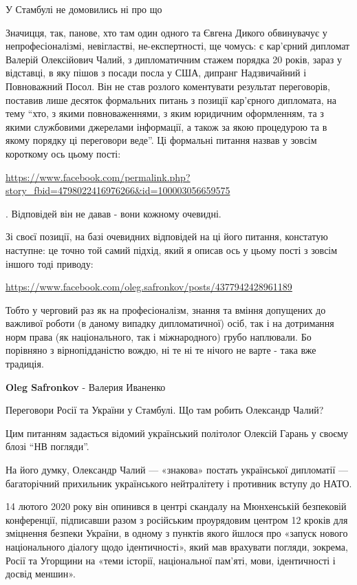 \begin{itemize}
У Стамбулі не домовились ні про що


Значицця, так, панове, хто там один одного та Євгена Дикого обвинувачує у
непрофесіоналізмі, невігластві, не-експертності, ще чомусь: є кар'єрний
дипломат Валерій Олексійович Чалий, з дипломатичним стажем порядка 20 років,
зараз у відставці, в яку пішов з посади посла у США, дипранг Надзвичайний і
Повноважний Посол. Він не став розлого коментувати результат переговорів,
поставив лише десяток формальних питань з позиції кар'єрного дипломата, на тему
\enquote{хто, з якими повноваженнями, з яким юридичним оформленням, та з якими
службовими джерелами інформації, а також за якою процедурою та в якому порядку
ці переговори веде}. Ці формальні питання назвав у зовсім короткому ось цьому
пості:

\url{https://www.facebook.com/permalink.php?story_fbid=4798022416976266&id=100003056659575}

. Відповідей він не давав - вони кожному очевидні.

Зі своєї позиції, на базі очевидних відповідей на ці його питання, констатую
наступне: це точно той самий підхід, який я описав ось у цьому пості з зовсім
іншого тоді приводу:

\url{https://www.facebook.com/oleg.safronkov/posts/4377942428961189}

Тобто у черговий раз як на професіоналізм, знання та вміння допущених до
важливої роботи (в даному випадку дипломатичної) осіб, так і на дотримання норм
права (як національного, так і міжнародного) грубо наплювали. Бо порівняно з
вірнопідданістю вождю, ні те ні те нічого не варте - така вже традиція.

\begin{itemize} %
\textbf{Oleg Safronkov} - Валерия Иваненко

Переговори Росії та України у Стамбулі. Що там робить Олександр Чалий?

Цим питанням задається відомий український політолог Олексій Гарань у своєму
блозі \enquote{НВ погляди}.

На його думку, Олександр Чалий — «знакова» постать української дипломатії —
багаторічний прихильник українського нейтралітету і противник вступу до НАТО.

14 лютого 2020 року він опинився в центрі скандалу на Мюнхенській безпековій
конференції, підписавши разом з російським проурядовим центром 12 кроків для
зміцнення безпеки України, в одному з пунктів якого йшлося про «запуск нового
національного діалогу щодо ідентичності», який мав врахувати погляди, зокрема,
Росії та Угорщини на «теми історії, національної пам’яті, мови, ідентичності і
досвід меншин».


\end{itemize}
\end{itemize}
